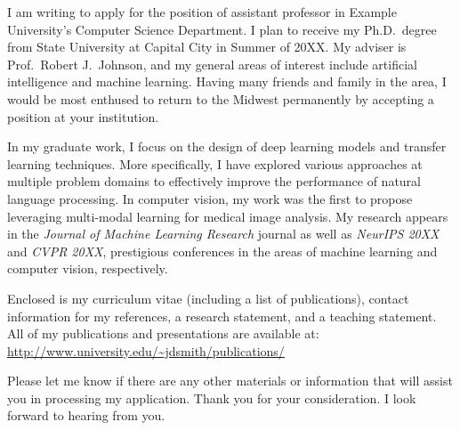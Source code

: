\documentclass[10pt,stdletter,dateno]{newlfm}
\begin{document}
\begin{newlfm}

I am writing to apply for the position of assistant
professor in Example University's Computer Science Department.  I plan to receive my
Ph.D.\ degree from State University at
Capital City in Summer of 20XX.  My adviser is
Prof.\ Robert J.\ Johnson, and my general areas of interest
include artificial intelligence and machine learning.
Having many friends and family in the area, I would be
most enthused to return to the Midwest permanently by accepting
a position at your institution.

In my graduate work, I focus on the design of
deep learning models and transfer learning techniques.
More specifically, I have explored various approaches at
multiple problem domains to effectively improve
the performance of natural language processing.  In computer vision,
my work was the first to propose leveraging multi-modal learning
for medical image analysis.  My research appears in 
the \textit{Journal of Machine Learning Research} journal as
well as \textit{NeurIPS 20XX} and \textit{CVPR 20XX},
prestigious conferences in the areas of machine learning and computer vision,
respectively.

Enclosed is my curriculum vitae (including a list of
publications), contact information for my references, a research
statement, and a teaching statement.  All of my publications and
presentations are available at:
\url{http://www.university.edu/~jdsmith/publications/}

Please let me know if there are any other materials
or information that will assist you in processing my application.
Thank you for your consideration.  I look forward to
hearing from you.

\end{newlfm}
\end{document}
